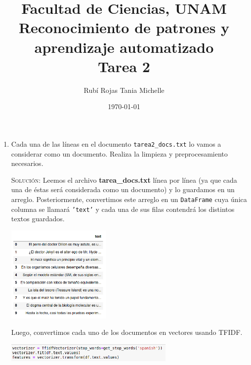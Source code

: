 \documentclass[letterpaper,11pt]{article}
\title{Facultad de Ciencias, UNAM \\ 
       Reconocimiento de patrones y aprendizaje automatizado \\ 
       Tarea 2}
\author{Rubí Rojas Tania Michelle}
\date{\today}
\begin{document}
\maketitle

\begin{enumerate}
    \item Cada una de las líneas en el documento \texttt{tarea2\_docs.txt} lo 
    vamos a considerar como un documento. Realiza la limpieza y preprocesamiento 
    necesarios.

    \textsc{Solución:} Leemos el archivo \textbf{tarea\_docs.txt} línea por 
    línea (ya que cada una de éstas será considerada como un documento) y lo 
    guardamos en un arreglo. Posteriormente, convertimos este arreglo en un 
    \texttt{DataFrame} cuya única columna se llamará \texttt{'text'} y cada una 
    de sus filas contendrá los distintos textos guardados.
    \begin{center}
        \includegraphics[width=0.4\textwidth]{imagenes/text1.png}
    \end{center}

    Luego, convertimos cada uno de los documentos en vectores usando TFIDF.
    \begin{center}
        \includegraphics[width=0.65\textwidth]{imagenes/text2.png}
    \end{center}


\end{enumerate}
\end{document}

